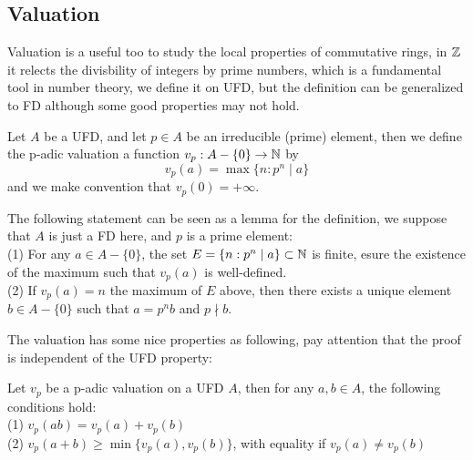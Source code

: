 \subsection*{Valuation}
Valuation is a useful too to study the local properties of commutative rings, in \(\mathbb{Z}\) it relects the divisbility of integers by prime numbers, which is a fundamental tool in number theory, we define it on UFD, but the definition can be generalized to FD although some good properties may not hold.
\begin{definition}
    Let \(A\) be a UFD, and let \(p \in A\) be an irreducible (prime) element, then we define the p-adic valuation a function \(v_p:A-\{0\} \to \mathbb{N}\) by
    \[v_p(a) = \max \{n : p^n \mid a\}\]
    and we make convention that \(v_p(0) = +\infty\).
\end{definition}

\begin{remark}
    The following statement can be seen as a lemma for the definition, we suppose that \(A\) is just a FD here, and \(p\) is a prime element:\\

    (1) For any \(a \in A-\{0\}\), the set \(E = \{n: p^n \mid a\} \subset \mathbb{N}\) is finite, esure the existence of the maximum such that \(v_p(a)\) is well-defined.\\

    (2) If \(v_p(a) = n\) the maximum of \(E\) above, then there exists a unique element \(b \in A-\{0\}\) such that \(a = p^n b\) and \(p \nmid b\).
\end{remark}

The valuation has some nice properties as following, pay attention that the proof is independent of the UFD property:
\begin{proposition}
    Let \(v_p\) be a p-adic valuation on a UFD \(A\), then for any \(a,b \in A\), the following conditions hold:\\
    (1) \(v_p(ab) = v_p(a) + v_p(b)\)\\
    (2) \(v_p(a+b) \geq \min\{v_p(a), v_p(b)\}\), with equality if \(v_p(a) \neq v_p(b)\)\\
\end{proposition}

